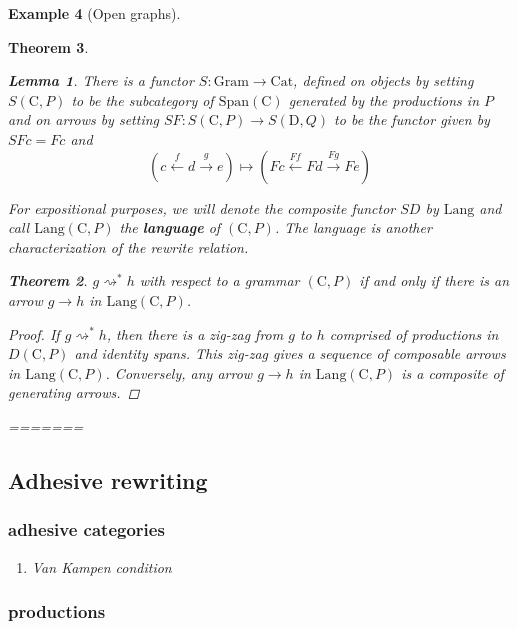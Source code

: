 \documentclass{amsart}
\newcommand{\C}{\cat{C}}
\newcommand{\D}{\cat{D}}
\newcommand{\Cat}{\cat{Cat}}
\newcommand{\Span}{\cat{Span}}
\newcommand{\Gram}{\cat{Gram}}
\newcommand{\Lang}{\mathrm{Lang}}
\newcommand{\Gram}{\cat{Gram}}
\newcommand{\Span}{\cat{Span}}
\newcommand{\defn}[1]{\textbf{#1}}
\newcommand{\cat}[1]{\mathrm{#1}}
\newcommand{\from}{\colon}
\newcommand{\xto}[1]{\xrightarrow{#1}}
\newcommand{\deriv}[2]{#1 \rightsquigarrow^\ast #2}
\newcommand{\xgets}[1]{\xleftarrow{#1}}
\newcommand{\xgets}[1]{\xleftarrow{#1}}
\newtheorem{theorem}{Theorem}[section]
\newtheorem{lemma}[theorem]{Lemma}
\theoremstyle{remark}
\theoremstyle{definition}
\newtheorem{example}[theorem]{Example}
\begin{document}
\begin{example}[Open graphs]
{{\begin{theorem}
\begin{lemma}
  There is a functor $ S \from \Gram \to \Cat $, defined on objects by
  setting $ S ( \C , P ) $ to be the subcategory of $ \Span ( \C ) $
  generated by the productions in $ P $ and on arrows by setting
  $ SF \from S ( \C , P ) \to S ( \D , Q ) $ to be the functor
  given by $ SFc = Fc $ and
  \[
    ( c \xgets{f} d \xto{g} e )
    \mapsto
    ( Fc \xgets{Ff} Fd \xto{Fg} Fe )
  \]
\end{lemma}

For expositional purposes, we will denote the composite functor $ SD $
by $ \Lang $ and call $ \Lang ( \C , P ) $ the \defn{language} of
$ ( \C , P ) $. The language is another characterization of the
rewrite relation.

\begin{theorem}
  $ \deriv{g}{h} $ with respect to a grammar $ ( \C , P ) $ if and
  only if there is an arrow $ g \to h $ in $ \Lang ( \C , P ) $.
\end{theorem}

\begin{proof}
  If $ \deriv{g}{h} $, then there is a zig-zag from $ g $ to $ h $
  comprised of productions in $ D ( \C , P ) $ and identity spans.
  This zig-zag gives a sequence of composable arrows in
  $ \Lang ( \C , P ) $.  Conversely, any arrow $ g \to h $ in
  $ \Lang ( \C , P ) $ is a composite of generating arrows.
\end{proof}
=======








\subsection{Adhesive rewriting}
\label{sec-3-3}

\subsubsection{adhesive categories}
\label{sec-3-3-1}
\begin{enumerate}
\item Van Kampen condition
\label{sec-3-3-1-1}
\end{enumerate}
\subsubsection{productions}
\label{sec-3-3-2}

\end{theorem}}}
\end{example}
\end{document}
